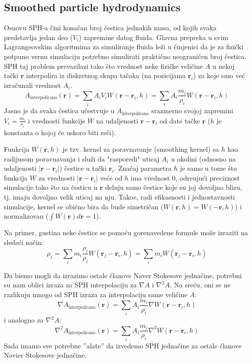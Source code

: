 \documentclass[12pt]{article}
\renewcommand{\vec}[1]{\mathbf{#1}}
\begin{document}
    \subsection{Smoothed particle hydrodynamics}
        Osnovu SPH-a \v cini kona\v can broj \v cestica jednakih masa, od kojih svaka predstavlja jedan deo ($V_i$) zapremine datog fluida.
        Glavna prepreka u svim Lagrangeovskim algoritmima za simuliranje fluida le\v zi u \v cinjenici da je za fizi\v cki potpuno vernu simulaciju potrebno simulirati prakti\v cno neograni\v cen broj \v cestica. SPH taj problem prevazilazi tako \v sto vrednost neke fizi\v cke veli\v cine $A$ u nekoj ta\v cki $\vec{r}$ interpolira iz diskretnog skupa ta\v caka (na pozicijama $\vec{r}_i$) za koje smo ve\'c izra\v cunali vrednost $A_i$.
            $$A_\text{interpolirano}(\vec{r}) = \sum_i{A_i V_i W(\vec{r}-\vec{r}_i, h)} = \sum_i{A_i \frac{m_i}{\rho_i} W(\vec{r}-\vec{r}_i, h)}$$
        Jasno je da svaka \v cestica u\v cestvuje u $A_\text{interpolirano}$ srazmerno svojoj zapremini $V_i=\frac{m_i}{\rho_i}$ i vrednosti funkcije $W$ na udaljenosti $\vec{r}-\vec{r}_i$ od date ta\v cke $\vec{r}$ ($h$ je konstanta o kojoj \'ce uskoro biti re\v ci).

        Funkcija $W(\vec{r}, h)$ je tzv. kernel za poravnavanje (smoothing kernel) sa $h$ kao radijusom poravnavanja i slu\v zi da "rasporedi" uticaj $A_i$ u okolini (odnosno na udaljenosti $|\vec{r}-\vec{r}_i|$) \v cestice u ta\v cki $\vec{r}_i$. Zna\v caj parametra $h$ je samo u tome \v sto funkcija $W$ za vrednosti $|\vec{r}-\vec{r}_i|$ ve\'ce od $h$ ima vrednost 0, odre\dj uju\'ci preciznost simulacije tako \v sto na \v cesticu u $\vec{r}$ deluju samo \v cestice koje su joj dovoljno blizu, tj. imaju dovoljno velik uticaj na nju. Tako\dj e, radi efikasnosti i jednostavnosti simulacije, kernel se obi\v cno bira da bude simetri\v can ($W(\vec{r}, h)=W(-\vec{r}, h)$) i normalizovan ($\int W(\vec{r})d\vec{r}=1$).

        Na primer, gustina neke \v cestice se pomo\'cu gorenavedene formule mo\v ze izraziti na slede\'ci na\v cin:
        $$\rho_j=\sum_i{m_i \frac{\rho_i}{\rho_i} W(\vec{r}_j-\vec{r}_i, h)}=\sum_i{m_i W(\vec{r}_j-\vec{r}_i, h)}$$

        Da bismo mogli da izrazimo ostale \v clanove Naver Stokesove jedna\v cine, potrebni su nam oblici izraza za SPH interpolaciju za $\nabla A$ i $\nabla^2 A$. Na sre\'cu, oni se ne razlikuju mnogo od SPH izraza za interpolaciju same veli\v cine $A$:
        $$\nabla A_\text{interpolirano}(\vec{r}) = \sum_i{A_i \frac{m_i}{\rho_i} \nabla W(\vec{r}-\vec{r}_i, h)}$$
        i analogno za $\nabla^2 A$:
        $$\nabla^2 A_\text{interpolirano}(\vec{r}) = \sum_i{A_i \frac{m_i}{\rho_i} \nabla^2 W(\vec{r}-\vec{r}_i, h)}$$
        Sada imamo sve potrebne ''alate'' da izvedemo SPH jedna\v cine za ostale \v clanove Navier Stokesove jedna\v cine.
\end{document}
